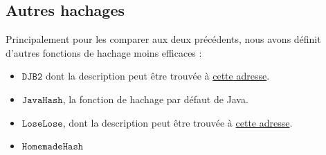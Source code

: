 \documentclass[12pt,a4paper,titlepage]{article}
\newcommand{\class}[1]{$\mathtt{#1}$}
\begin{document}
\subsection{Autres hachages}
Principalement pour les comparer aux deux précédents, nous avons définit d'autres fonctions de hachage moins efficaces :
\begin{itemize}
\item \class{DJB2} dont la description peut être trouvée à \href{http://www.cse.yorku.ca/~oz/hash.html}{cette adresse}.
\item \class{JavaHash}, la fonction de hachage par défaut de Java.
\item \class{LoseLose}, dont la description peut être trouvée à \href{http://www.cse.yorku.ca/~oz/hash.html}{cette adresse}.
\item \class{HomemadeHash} 
\end{itemize}
\end{document}
